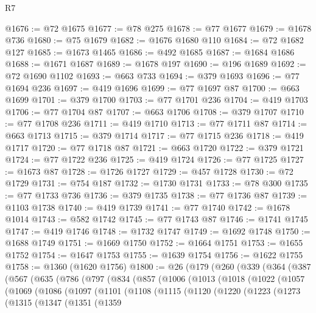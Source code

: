 \begin{lexlean}{R7}
\begin{coremodule}
@1676 := @72 @1675
@1677 := @78 @275
@1678 := @77 @1677
@1679 := @1678 @736
@1680 := @75 @1679
@1682 := @1676 @1680 @110
@1684 := @72 @1682 @127
@1685 := @1673 @1465
@1686 := @492 @1685
@1687 := @1684 @1686
@1688 := @1671 @1687
@1689 := @1678 @197
@1690 := @196 @1689
@1692 := @72 @1690 @1102
@1693 := @663 @733
@1694 := @379 @1693
@1696 := @77 @1694 @236
@1697 := @419 @1696
@1699 := @77 @1697 @87
@1700 := @663 @1699
@1701 := @379 @1700
@1703 := @77 @1701 @236
@1704 := @419 @1703
@1706 := @77 @1704 @87
@1707 := @663 @1706
@1708 := @379 @1707
@1710 := @77 @1708 @236
@1711 := @419 @1710
@1713 := @77 @1711 @87
@1714 := @663 @1713
@1715 := @379 @1714
@1717 := @77 @1715 @236
@1718 := @419 @1717
@1720 := @77 @1718 @87
@1721 := @663 @1720
@1722 := @379 @1721
@1724 := @77 @1722 @236
@1725 := @419 @1724
@1726 := @77 @1725
@1727 := @1673 @87
@1728 := @1726 @1727
@1729 := @457 @1728
@1730 := @72 @1729
@1731 := @754 @187
@1732 := @1730 @1731
@1733 := @78 @300
@1735 := @77 @1733 @736
@1736 := @379 @1735
@1738 := @77 @1736 @87
@1739 := @1103 @1738
@1740 := @419 @1739
@1741 := @77 @1740
@1742 := @1678 @1014
@1743 := @582 @1742
@1745 := @77 @1743 @87
@1746 := @1741 @1745
@1747 := @419 @1746
@1748 := @1732 @1747
@1749 := @1692 @1748
@1750 := @1688 @1749
@1751 := @1669 @1750
@1752 := @1664 @1751
@1753 := @1655 @1752
@1754 := @1647 @1753
@1755 := @1639 @1754
@1756 := @1622 @1755
@1758 := @1360 (@1620 @1756)
@1800 := @26
    (@179
      (@260
        (@339
          (@364
            (@387
              (@567
                (@635
                  (@786
                    (@797
                      (@834
                        (@857
                          (@1006
                            (@1013
                              (@1018
                                (@1022
                                  (@1057
                                    (@1069
                                      (@1086
                                        (@1097
                                          (@1101
                                            (@1108
                                              (@1115
                                                (@1120
                                                  (@1220
                                                    (@1223
                                                      (@1273
                                                        (@1315
                                                          (@1347
                                                            (@1351
                                                              (@1359

\end{coremodule}
\end{lexlean}
